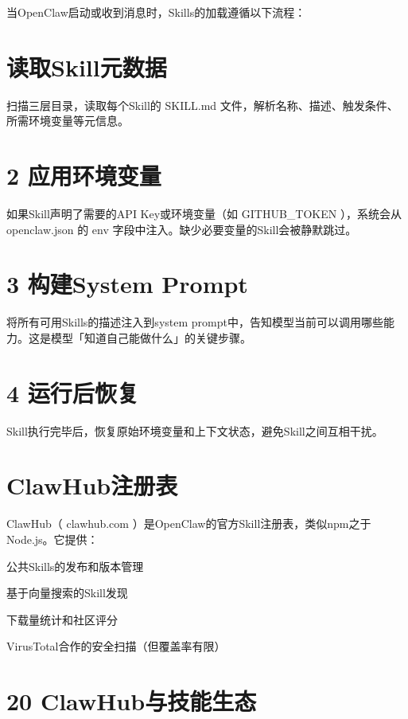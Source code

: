 \documentclass[
  10
]{article}
\begin{document}
当OpenClaw启动或收到消息时，Skills的加载遵循以下流程：

\section{读取Skill元数据}\label{ux8bfbux53d6skillux5143ux6570ux636e}

扫描三层目录，读取每个Skill的 SKILL.md
文件，解析名称、描述、触发条件、所需环境变量等元信息。

\section{2 应用环境变量}\label{ux5e94ux7528ux73afux5883ux53d8ux91cf}

如果Skill声明了需要的API Key或环境变量（如 GITHUB\_TOKEN ），系统会从
openclaw.json 的 env 字段中注入。缺少必要变量的Skill会被静默跳过。

\section{3 构建System Prompt}\label{ux6784ux5efasystem-prompt}

将所有可用Skills的描述注入到system
prompt中，告知模型当前可以调用哪些能力。这是模型「知道自己能做什么」的关键步骤。

\section{4 运行后恢复}\label{ux8fd0ux884cux540eux6062ux590d}

Skill执行完毕后，恢复原始环境变量和上下文状态，避免Skill之间互相干扰。

\section{ClawHub注册表}\label{clawhubux6ce8ux518cux8868}

ClawHub（ clawhub.com
）是OpenClaw的官方Skill注册表，类似npm之于Node.js。它提供：

公共Skills的发布和版本管理

基于向量搜索的Skill发现

下载量统计和社区评分

VirusTotal合作的安全扫描（但覆盖率有限）

\section{20
ClawHub与技能生态}\label{clawhubux4e0eux6280ux80fdux751fux6001}
\end{document}
